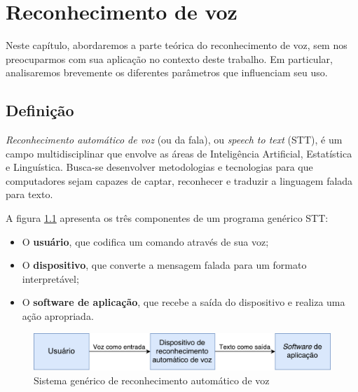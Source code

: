 \chapter{Reconhecimento de voz}
\label{cap:speech-to-text}

Neste capítulo, abordaremos a parte teórica do reconhecimento de voz, sem nos preocuparmos com sua aplicação no contexto deste trabalho. Em particular, analisaremos brevemente os diferentes parâmetros que influenciam seu uso.


\section{Definição}


\textit{Reconhecimento automático de voz} (ou da fala), ou \textit{speech to text} (STT), é um campo multidisciplinar que envolve as áreas de Inteligência Artificial, Estatística e Linguística. Busca-se desenvolver metodologias e tecnologias para que computadores sejam capazes de captar, reconhecer e traduzir a linguagem falada para texto.

A figura \ref{generic-stt} apresenta os três componentes de um programa genérico STT:

\begin{itemize}
\item O \textbf{usuário}, que codifica um comando através de sua voz;

\item O \textbf{dispositivo}, que converte a mensagem falada para um formato interpretável;

\item O \textbf{software de aplicação}, que recebe a saída do dispositivo e realiza uma ação apropriada.
\end{itemize}

\begin{figure}[H]
  \centering
  \includegraphics[width=.9\textwidth]{image/generic-stt.pdf}
  \caption{Sistema genérico de reconhecimento automático de voz}
  \label{generic-stt}
\end{figure}

